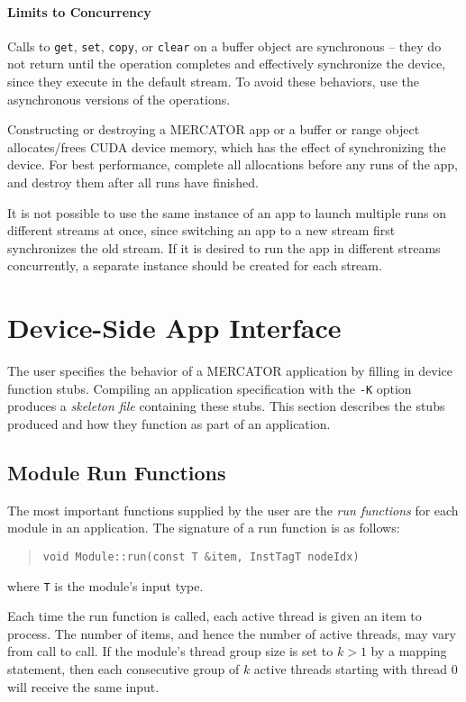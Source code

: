 \documentclass[11pt]{article}
\begin{document}
\paragraph*{Limits to Concurrency}

Calls to \texttt{get}, \texttt{set}, \texttt{copy}, or \texttt{clear}
on a buffer object are synchronous -- they do not return until the
operation completes and effectively synchronize the device, since they
execute in the default stream.  To avoid these behaviors, use the
asynchronous versions of the operations.
  
Constructing or destroying a MERCATOR app or a buffer or range object
allocates/frees CUDA device memory, which has the effect of
synchronizing the device.  For best performance, complete all
allocations before any runs of the app, and destroy them after all
runs have finished.

It is not possible to use the same instance of an app to launch
multiple runs on different streams at once, since switching an app to
a new stream first synchronizes the old stream.  If it is desired to
run the app in different streams concurrently, a separate instance
should be created for each stream.


\section{Device-Side App Interface}

The user specifies the behavior of a MERCATOR application by filling
in device function stubs.  Compiling an application specification with
the \texttt{-K} option produces a \textit{skeleton file} containing
these stubs.  This section describes the stubs produced and how they
function as part of an application.

\subsection{Module Run Functions}

The most important functions supplied by the user are the \textit{run
  functions} for each module in an application.  The signature of a
run function is as follows:
\begin{quote}
\texttt{void Module::run(const T \&item, InstTagT nodeIdx)}
\end{quote}
where \texttt{T} is the module's input type.

Each time the run function is called, each active thread is given an
item to process.  The number of items, and hence the number of active
threads, may vary from call to call.  If the module's thread group
size is set to $k > 1$ by a mapping statement, then each consecutive
group of $k$ active threads starting with thread 0 will receive the
same input.
\end{document}
